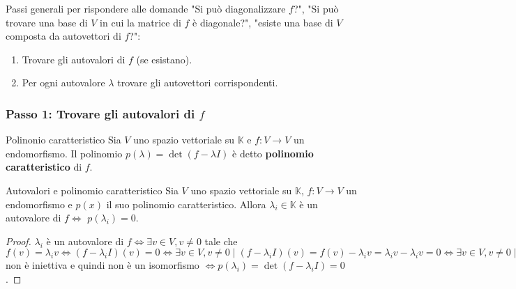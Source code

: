 \documentclass[a4paper]{article}
\theoremstyle{definition}
\begin{document}
	Passi generali per rispondere alle domande "Si può diagonalizzare $f$?",
	"Si può trovare una base di $V$ in cui la matrice di $f$ è diagonale?",
	"esiste una base di $V$ composta da autovettori di $f$?":
	\begin{enumerate}
		\item Trovare gli autovalori di $f$ (se esistano).
		\item Per ogni autovalore $\lambda$ trovare gli autovettori corrispondenti.
	\end{enumerate}

	\subsubsection{Passo 1: Trovare gli autovalori di $f$}
	\begin{deff}{Polinonio caratteristico}{}
		Sia $V$ uno spazio vettoriale su $\mathbb{K}$ e $f: V \to V$ un endomorfismo.
		Il polinomio $p(\lambda) = \det(f - \lambda I)$ è detto \textbf{polinomio caratteristico} di $f$.
	\end{deff}
	\begin{teo}{Autovalori e polinomio caratteristico}{}
		Sia $V$ uno spazio vettoriale su $\mathbb{K}$, $f: V \to V$ un endomorfismo e $p(x)$ il suo polinomio caratteristico.
		Allora $\lambda_i \in \mathbb{K}$ è un autovalore di $f \Leftrightarrow$ $p(\lambda_i) = 0$.
	\end{teo}
	\begin{proof}
		$\lambda_i$ è un autovalore di $f \Leftrightarrow \exists v \in V, v \ne 0$ tale che $f(v) = \lambda_i v \Leftrightarrow (f - \lambda_i I)(v) = 0
		\Leftrightarrow \exists v \in V, v \ne 0 \mid (f - \lambda_i I)(v) = f(v) - \lambda_i v = \lambda_i v - \lambda_i v = 0
		\Leftrightarrow \exists v \in V, v \ne 0 \mid v \in \ker (f - \lambda_i V)
		\Leftrightarrow \ker (f - \lambda_i I) \ne \{0\} \Leftrightarrow f - \lambda_i I$ non è iniettiva e quindi non è un isomorfismo
		$\Leftrightarrow p(\lambda_i) = \det(f - \lambda_i I) = 0$.
	\end{proof}
\end{document}
